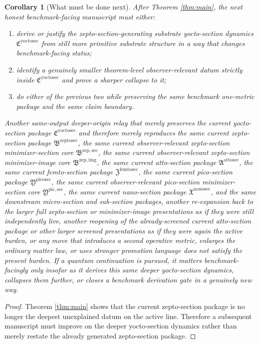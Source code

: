 \documentclass[11pt]{article}
\newcommand{\NanoSectionPackage}{\mathfrak X^{\mathrm{nanosec}}}
\newcommand{\PicoSectionPackage}{\mathfrak Y^{\mathrm{picosec}}}
\newcommand{\PicoMinSectionCore}{\mathfrak Y^{\mathrm{pic,sec}}}
\newcommand{\FemtoSectionPackage}{\mathfrak Z^{\mathrm{femtosec}}}
\newcommand{\AttoSectionPackage}{\mathfrak A^{\mathrm{attosec}}}
\newcommand{\ZeptoSectionPackage}{\mathfrak B^{\mathrm{zeptosec}}}
\newcommand{\ZeptoImageCore}{\mathfrak B^{\mathrm{zep,img}}}
\newcommand{\ZeptoMinSectionCore}{\mathfrak B^{\mathrm{zep,sec}}}
\newcommand{\YoctoSectionPackage}{\mathfrak C^{\mathrm{yoctosec}}}
\newtheorem{corollary}{Corollary}
\begin{document}
\begin{corollary}[What must be done next]
\label{cor:next}
After Theorem \ref{thm:main}, the next honest benchmark-facing manuscript must either:
\begin{enumerate}
    \item derive or justify the zepto-section-generating substrate yocto-section dynamics \(\YoctoSectionPackage\) from still more primitive substrate structure in a way that changes benchmark-facing status;
    \item identify a genuinely smaller theorem-level observer-relevant datum strictly inside \(\YoctoSectionPackage\) and prove a sharper collapse to it;
    \item do either of the previous two while preserving the same benchmark one-metric package and the same claim boundary.
\end{enumerate}
Another same-output deeper-origin relay that merely preserves the current yocto-section package \(\YoctoSectionPackage\) and therefore merely reproduces the same current zepto-section package \(\ZeptoSectionPackage\), the same current observer-relevant zepto-section minimizer-section core \(\ZeptoMinSectionCore\), the same current observer-relevant zepto-section minimizer-image core \(\ZeptoImageCore\), the same current atto-section package \(\AttoSectionPackage\), the same current femto-section package \(\FemtoSectionPackage\), the same current pico-section package \(\PicoSectionPackage\), the same current observer-relevant pico-section minimizer-section core \(\PicoMinSectionCore\), the same current nano-section package \(\NanoSectionPackage\), and the same downstream micro-section and sub-section packages, another re-expansion back to the larger full zepto-section or minimizer-image presentations as if they were still independently live, another reopening of the already-screened current atto-section package or other larger screened presentations as if they were again the active burden, or any move that introduces a second operative metric, enlarges the ordinary matter law, or uses stronger promotion language does not satisfy the present burden. If a quantum continuation is pursued, it matters benchmark-facingly only insofar as it derives this same deeper yocto-section dynamics, collapses them further, or closes a benchmark derivation gate in a genuinely new way.
\end{corollary}

\begin{proof}
Theorem \ref{thm:main} shows that the current zepto-section package is no longer the deepest unexplained datum on the active line. Therefore a subsequent manuscript must improve on the deeper yocto-section dynamics rather than merely restate the already generated zepto-section package.
\end{proof}
\end{document}
